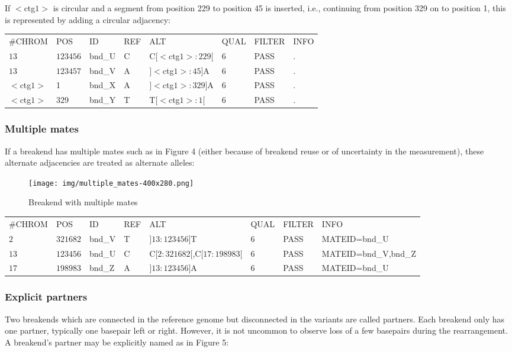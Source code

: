\documentclass[8pt]{article}
\begin{document}
If $<$ctg$1>$ is circular and a segment from position 229 to position 45 is inserted, i.e., continuing from position 329 on to position 1, this is represented by adding a circular adjacency:

\vspace{0.3cm}
\small
\begin{tabular}{ l l l l l l l l }
\#CHROM & POS & ID & REF & ALT & QUAL & FILTER & INFO \\
$13$ & $123456$ & bnd\_U & C & C$[<$ctg$1>:229[$ & 6 & PASS & . \\
$13$ & $123457$ & bnd\_V & A & $]<$ctg$1>:45]$A & 6 & PASS & . \\
$<$ctg$1>$ & 1 & bnd\_X & A & $]<$ctg$1>:329]$A & 6 & PASS & . \\
$<$ctg$1>$ & 329 & bnd\_Y & T & T$[<$ctg$1>:1[$ & 6 & PASS & . \\
\end{tabular}
\normalsize

\subsubsection{Multiple mates}
If a breakend has multiple mates such as in Figure 4 (either because of breakend reuse or of uncertainty in the measurement), these alternate adjacencies are treated as alternate alleles:

\begin{figure}[h]
\centering
\texttt{[image: img/multiple\_mates-400x280.png]}
\caption{Breakend with multiple mates}
\end{figure}

\footnotesize
\begin{tabular}{ l l l l l l l l }
\#CHROM & POS & ID & REF & ALT & QUAL & FILTER & INFO \\
$2$ & $321682$ & bnd\_V & T & $]13:123456]$T & 6 & PASS & MATEID=bnd\_U \\
$13$ & $123456$ & bnd\_U & C & C$[2:321682[$,C$[17:198983[$ & 6 & PASS & MATEID=bnd\_V,bnd\_Z \\
$17$ & $198983$ & bnd\_Z & A & $]13:123456]$A & 6 & PASS & MATEID=bnd\_U \\
\end{tabular}
\normalsize

\subsubsection{Explicit partners}
\label{explicit-partners}
Two breakends which are connected in the reference genome but disconnected in the variants are called partners.
Each breakend only has one partner, typically one basepair left or right.
However, it is not uncommon to observe loss of a few basepairs during the rearrangement.
A breakend's partner may be explicitly named as in Figure 5:
\end{document}
